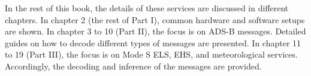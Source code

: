 In the rest of this book, the details of these services are discussed in different chapters. In chapter 2 (the rest of Part I), common hardware and software setups are shown. In chapter 3 to 10 (Part II), the focus is on ADS-B messages. Detailed guides on how to decode different types of messages are presented. In chapter 11 to 19 (Part III), the focus is on Mode S ELS, EHS, and meteorological services. Accordingly, the decoding and inference of the messages are provided.
